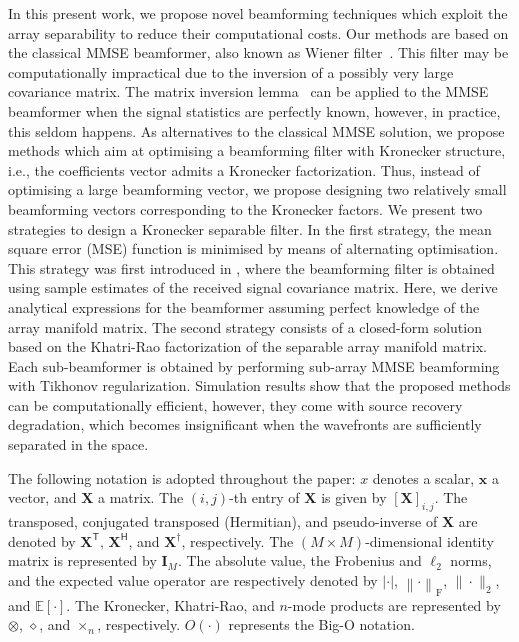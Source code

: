 \documentclass{cta-author}
\newcommand{\tran}{\mathsf{T}}						%
\newcommand{\hermit}{\mathsf{H}}					%
\newcommand{\frob}[1]{\ensuremath{\left\|#1\right\|_\textrm{F}}}	%
\newcommand{\esp}[1]{\ensuremath{\mathbb{E}\left[#1\right]}}		%
\begin{document}
In this present work, we propose novel beamforming techniques which exploit the array separability to reduce their computational costs. Our methods are based on the classical MMSE beamformer, also known as Wiener filter~\cite{haykin_adaptive_1996}. This filter may be computationally impractical due to the inversion of a possibly very large covariance matrix. The matrix inversion lemma~\cite{petersen_matrix_2012} can be applied to the MMSE beamformer when the signal statistics are perfectly known, however, in practice, this seldom happens. As alternatives to the classical MMSE solution, we propose methods which aim at optimising a beamforming filter with Kronecker structure, i.e., the coefficients vector admits a Kronecker factorization. Thus, instead of optimising a large beamforming vector, we propose designing two relatively small beamforming vectors corresponding to the Kronecker factors. We present two strategies to design a Kronecker separable filter. In the first strategy, the mean square error (MSE) function is minimised by means of alternating optimisation. This strategy was first introduced in \cite{ribeiro_tensor_2016}, where the beamforming filter is obtained using sample estimates of the received signal covariance matrix. Here, we derive analytical expressions for the beamformer assuming perfect knowledge of the array manifold matrix. The second strategy consists of a closed-form solution based on the Khatri-Rao factorization of the separable array manifold matrix. Each sub-beamformer is obtained by performing sub-array MMSE beamforming with Tikhonov regularization. Simulation results show that the proposed methods can be computationally efficient, however, they come with source recovery degradation, which becomes insignificant when the wavefronts are sufficiently separated in the space.

The following notation is adopted throughout the paper: $x$ denotes a scalar, $\bm{x}$ a vector, and $\bm{X}$ a matrix. The $(i,j)$-th entry of $\bm{X}$ is given by $[\bm{X}]_{i,j}$. The transposed, conjugated transposed (Hermitian), and pseudo-inverse of $\bm{X}$ are denoted by $\bm{X}^\tran$, $\bm{X}^\hermit$, and $\bm{X}^\dagger$, respectively. The $(M\times M)$-dimensional identity matrix is represented by $\bm{I}_M$. The absolute value, the Frobenius and $\ell_2$ norms, and the expected value operator are respectively denoted by $|\cdot|$, $\frob{\cdot}$, $\| \cdot \|_2$, and $\esp{\cdot}$. The Kronecker, Khatri-Rao, and $n$-mode products are represented by $\otimes$, $\diamond$, and $\times_n$, respectively. $O(\cdot)$ represents the Big-O notation.
\end{document}
